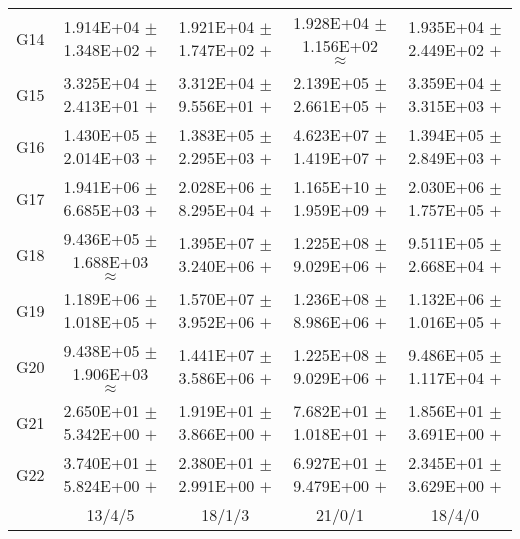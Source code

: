 \documentclass[paper]{ieice}
\begin{document}
\begin{table*}[htbp]
\begin{tabular}{c|c|c|c|c}
		G14	&	1.914E+04	$\pm$	1.348E+02	$+$	&	1.921E+04	$\pm$	1.747E+02	$+$	&	1.928E+04	$\pm$	1.156E+02	$\approx$	&	1.935E+04	$\pm$	2.449E+02	$+$	\\
		G15	&	3.325E+04	$\pm$	2.413E+01	$+$	&	3.312E+04	$\pm$	9.556E+01	$+$	&	2.139E+05	$\pm$	2.661E+05	$+$	&	3.359E+04	$\pm$	3.315E+03	$+$	\\
		G16	&	1.430E+05	$\pm$	2.014E+03	$+$	&	1.383E+05	$\pm$	2.295E+03	$+$	&	4.623E+07	$\pm$	1.419E+07	$+$	&	1.394E+05	$\pm$	2.849E+03	$+$	\\
		G17	&	1.941E+06	$\pm$	6.685E+03	$+$	&	2.028E+06	$\pm$	8.295E+04	$+$	&	1.165E+10	$\pm$	1.959E+09	$+$	&	2.030E+06	$\pm$	1.757E+05	$+$	\\
		G18	&	9.436E+05	$\pm$	1.688E+03	$\approx$	&	1.395E+07	$\pm$	3.240E+06	$+$	&	1.225E+08	$\pm$	9.029E+06	$+$	&	9.511E+05	$\pm$	2.668E+04	$+$	\\
		G19	&	1.189E+06	$\pm$	1.018E+05	$+$	&	1.570E+07	$\pm$	3.952E+06	$+$	&	1.236E+08	$\pm$	8.986E+06	$+$	&	1.132E+06	$\pm$	1.016E+05	$+$	\\
		G20	&	9.438E+05	$\pm$	1.906E+03	$\approx$	&	1.441E+07	$\pm$	3.586E+06	$+$	&	1.225E+08	$\pm$	9.029E+06	$+$	&	9.486E+05	$\pm$	1.117E+04	$+$	\\
		G21	&	2.650E+01	$\pm$	5.342E+00	$+$	&	1.919E+01	$\pm$	3.866E+00	$+$	&	7.682E+01	$\pm$	1.018E+01	$+$	&	1.856E+01	$\pm$	3.691E+00	$+$	\\
		G22	&	3.740E+01	$\pm$	5.824E+00	$+$	&	2.380E+01	$\pm$	2.991E+00	$+$	&	6.927E+01	$\pm$	9.479E+00	$+$	&	2.345E+01	$\pm$	3.629E+00	$+$	\\  \hline
		&	13/4/5     &	18/1/3				&	21/0/1				&	18/4/0				\\ \hline   
	\end{tabular}
\end{table*}
\end{document}
